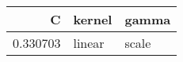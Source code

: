 \begin{tabular}{rll}
\toprule
C & kernel & gamma \\
\midrule
0.330703 & linear & scale \\
\bottomrule
\end{tabular}
